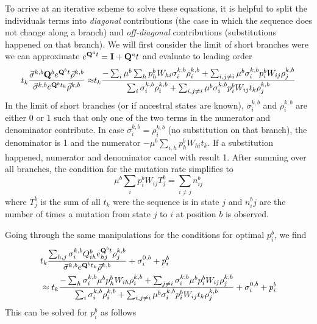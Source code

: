 \documentclass[aps,rmp, onecolumn]{revtex4}
\newcommand{\mat}[1]{{\bf #1}}
\newcommand{\eqp}{p}
\begin{document}
To arrive at an iterative scheme to solve these equations, it is helpful to split the individuals terms into \emph{diagonal} contributions (the case in which the sequence does not change along a branch) and \emph{off-diagonal} contributions (substitutions happened on that branch).
We will first consider the limit of short branches were we can approximate $e^{\mat{Q}^at}=\mat{I} + \mat{Q}^at$ and evaluate to leading order
\begin{equation}
\begin{split}
t_k\frac{\vec{\sigma}^{k,b} \mat{Q}^{b} e^{\mat{Q}^{b}t} \vec{\rho}^{k,b}}{\vec{\sigma}^{k,b} e^{\mat{Q}^{b}t_k} \vec{\rho}^{k,b}} \approx &	t_k \frac{-\sum_{i} \mu^b\sum_h p_h^b W_{hi} \sigma^{k,b}_i \rho^{k,b}_i + \sum_{i, j\neq i} \mu^b\sigma^{k,b}_i p_i^bW_{ij} \rho^{k,b}_j}{\sum_{i} \sigma^{k,b}_i \rho^{k,b}_i + \sum_{i,j\neq i} \mu^b \sigma^{k,b}_i \eqp_i^b W_{ij}t_k \rho^{k,b}_j}\\
\end{split}
\end{equation}
In the limit of short branches (or if ancestral states are known), $\sigma^{k,b}_i$ and $\rho^{k,b}_i$ are either $0$ or $1$ such that only one of the two terms in the numerator and denominator contribute.
In case $\sigma^{k,b}_i=\rho^{k,b}_i$ (no substitution on that branch), the denominator is 1 and the numerator $- \mu^b \sum_{i,h}p_h^b W_{hi}t_k$.
If a substitution happened, numerator and denominator cancel with result 1.
After summing over all branches, the condition for the mutation rate simplifies to
\begin{equation}
	\mu^b \sum_i \eqp_i^b W_{ij}T_j^b = \sum_{i\neq j} n^b_{ij}
\end{equation}
where $T_j^b$ is the sum of all $t_k$ were the sequence is in state $j$ and $n^b_ij$ are the number of times a mutation from state $j$ to $i$ at position $b$ is observed.

Going through the same manipulations for the conditions for optimal $\eqp^b_i$, we find
\begin{equation}
	\begin{split}
& t_k\frac{\sum_{h,j}\sigma^{k,b}_i Q^{b}_{ih} e^{\mat{Q}^{b}t}_{hj} \rho^{k,b}_j}{\vec{\sigma}^{k,b} e^{\mat{Q}^{b}t_k} \vec{\rho}^{k,b}} + \sigma_i^{0,b}+\eqp_i^b \\
&\approx t_k \frac{-\sum_{h}\sigma^{k,b}_i\mu^b p_h^b W_{ih} \rho^{k,b}_i + \sum_{j\neq i}\sigma^{k,b}_i \mu^b \eqp_i^b W_{ij} \rho^{k,b}_j}{\sum_{i} \sigma^{k,b}_i \rho^{k,b}_i + \sum_{i,j\neq i} \mu^b \sigma^{k,b}_i \eqp_i^b W_{ij}t_k \rho^{k,b}_j} + \sigma_i^{0,b}+\eqp_i^b
	\end{split}
\end{equation}
This can be solved for $p_i^{b}$ as follows



\end{document}
